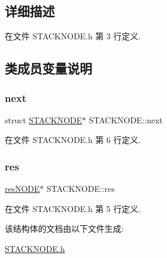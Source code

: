 \subsection{详细描述}


在文件 S\+T\+A\+C\+K\+N\+O\+D\+E.\+h 第 3 行定义.



\subsection{类成员变量说明}
\mbox{\label{struct_s_t_a_c_k_n_o_d_e_a50a11b6592f7f4903de61e4883bd7e34}} 
\subsubsection{\texorpdfstring{next}{next}}
{\footnotesize\ttfamily struct \hyperlink{struct_s_t_a_c_k_n_o_d_e}{S\+T\+A\+C\+K\+N\+O\+DE}$\ast$ S\+T\+A\+C\+K\+N\+O\+D\+E\+::next}



在文件 S\+T\+A\+C\+K\+N\+O\+D\+E.\+h 第 6 行定义.

\mbox{\label{struct_s_t_a_c_k_n_o_d_e_afbbdf65611e982f361a73587b22aa862}} 
\subsubsection{\texorpdfstring{res}{res}}
{\footnotesize\ttfamily \hyperlink{res_node_8h_a99a496180780a83679ea667c9bc79fec}{res\+N\+O\+DE}$\ast$ S\+T\+A\+C\+K\+N\+O\+D\+E\+::res}



在文件 S\+T\+A\+C\+K\+N\+O\+D\+E.\+h 第 5 行定义.



该结构体的文档由以下文件生成\+:\begin{DoxyCompactItemize}
\item 
\hyperlink{_s_t_a_c_k_n_o_d_e_8h}{S\+T\+A\+C\+K\+N\+O\+D\+E.\+h}\end{DoxyCompactItemize}
